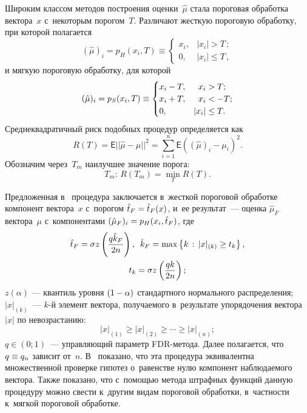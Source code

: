 \begin{multicols}{2}
Широким классом методов построения оценки~$\hat{\mu}$ стала пороговая обработка 
вектора~$x$ с~некоторым порогом~$T$. Различают жесткую пороговую обработку, при 
которой полагается
\begin{equation*}
\left(\hat{\mu}\right)_i  = p_H(x_i,T) \equiv
 \begin{cases}
   x_i, & |x_i| > T\,;\\
   0, & |x_i| \leq T\,,
 \end{cases}
\end{equation*}
и мягкую пороговую обработку, для которой
\begin{equation*}
(\hat{\mu})_i  = p_S(x_i,T) \equiv
 \begin{cases}
   x_i-T, & \hphantom{\vert\vert}x_i > T;\\
   x_i+T, & \hphantom{\vert\vert}x_i <- T;\\
   0, & |x_i| \leq T.
 \end{cases}
\end{equation*}
Среднеквадратичный риск подобных процедур определяется как
\begin{equation}
\label{riskDef}
R(T) = {\mathsf E} ||\hat{\mu}-\mu||^2 = \sum\limits_{i=1}^n {\mathsf E} \left((\hat{\mu})_i-
\mu_i\right)^2.
\end{equation}
Обозначим через~$T_m$ наилучшее значение порога:
$$
T_m : \, R(T_m) = \min\limits_{T} R(T).
$$

Предложенная в~\cite{AdaptingFDR} процедура заключается в~жесткой пороговой 
обработке компонент вектора~$x$ с~порогом $\hat{t}_F \hm= \hat{t}_F(x)$, и~ее 
результат~--- оценка $\hat{\mu}_F$ вектора~$\mu$ с~компонентами $(\hat{\mu}_F)_i  
\hm= p_H(x_i,\hat{t}_F)$, где
\begin{multline*}
\hat{t}_F = \sigma z\left(\displaystyle\frac{\displaystyle q \hat{k}_F\mathstrut}{\displaystyle 2n\mathstrut}\right), \enskip
\hat{k}_F = \max 
\left\{k \, :\, |x|_{(k)} \geq t_k \right\}, \\
 t_k = \sigma z\left(\displaystyle\frac{\displaystyle q  k\mathstrut}{\displaystyle 2n\mathstrut}\right);
\end{multline*}
$z(\alpha)$ --- квантиль уровня $(1\hm-\alpha)$ стандартного нормального 
распределения; $|x|_{(k)}$~--- $k$-й элемент вектора, получаемого в~результате 
упорядочения вектора~$|x|$ по невозрастанию:
$$
|x|_{(1)} \geq |x|_{(2)} \geq \cdots \geq |x|_{(n)};
$$
$q\in(0;1)$~--- управ\-ля\-ющий параметр FDR-ме\-то\-да.
Далее полагается, что $q\hm\equiv q_n$ зависит от~$n$. В~\cite{AdaptingFDR} 
показано, что эта процедура эквивалентна множественной проверке гипотез 
о~равенстве нулю компонент наблюдаемого вектора. Также показано, что с~помощью 
метода штрафных функций данную процедуру можно свести к~другим видам пороговой 
обработки, в~част\-ности к~мягкой пороговой обработке.


\end{multicols}
